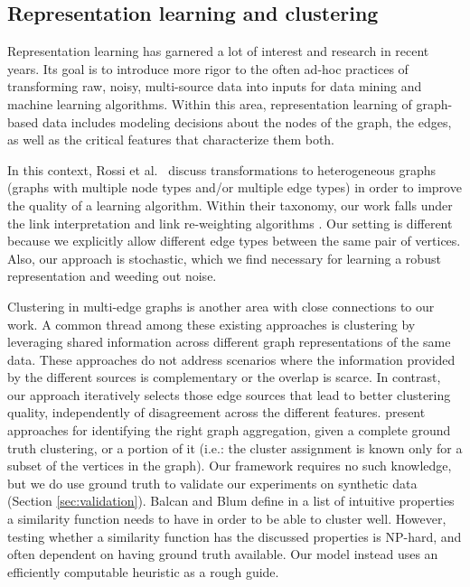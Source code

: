 \documentclass{IEEEtran}
\begin{document}
\subsection{Representation learning and clustering}
Representation learning has garnered a lot of interest and research in recent
years. Its goal is to introduce more rigor to the often ad-hoc practices of
transforming raw, noisy, multi-source data into inputs for data mining and
machine learning algorithms. Within this area, representation learning of
graph-based data includes modeling decisions about the nodes of the graph, the
edges, as well as the critical features that characterize them both.

In this context, Rossi et al.~\cite{Rossi2012} discuss transformations to
heterogeneous graphs (graphs with multiple node types and/or multiple edge
types) in order to improve the quality of a learning algorithm. Within their
taxonomy, our work falls under the link interpretation and link re-weighting
algorithms \cite{Xiang2010,Gilbert2009}. Our setting is different because we
explicitly allow different edge types between the same pair of vertices. Also,
our approach is stochastic, which we find necessary for learning a robust
representation and weeding out noise. 

Clustering in multi-edge graphs
\cite{Papalexakis2013,Tang2009,Tang2012,Mucha2010,Berlingerio2011,kolda2009} is
another area with close connections to our work. A common thread among these
existing approaches is clustering by leveraging shared information across
different graph representations of the same data. These approaches do not
address scenarios where the information provided by the different sources is
complementary or the overlap is scarce. In contrast, our approach iteratively
selects those edge sources that lead to better clustering quality,
independently of disagreement across the different features.
\cite{Rocklin2013,Cai2005} present approaches for identifying the right graph
aggregation, given a complete ground truth clustering, or a portion of it
(i.e.: the cluster assignment is known only for a subset of the vertices in the
graph). Our framework requires no such knowledge, but we do use ground truth to
validate our experiments on synthetic data (Section \ref{sec:validation}).
Balcan and Blum define in \cite{Balcan2006,Balcan2008} a list of intuitive
properties a similarity function needs to have in order to be able to cluster
well. However, testing whether a similarity function has the discussed
properties is NP-hard, and often dependent on having ground truth available.
Our model instead uses an efficiently computable heuristic as a rough guide.
\end{document}
